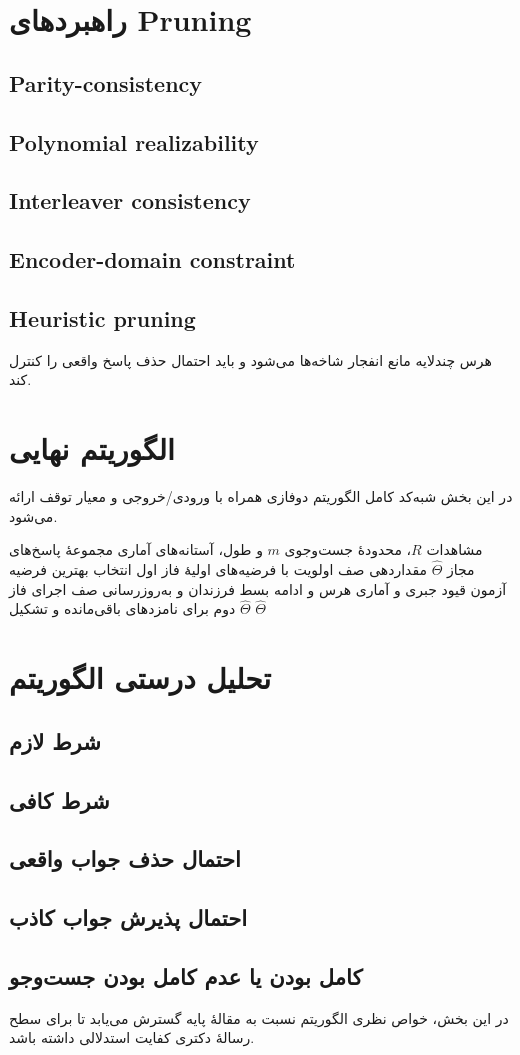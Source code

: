 \section{راهبردهای Pruning}
\subsection{Parity-consistency}
\subsection{Polynomial realizability}
\subsection{Interleaver consistency}
\subsection{Encoder-domain constraint}
\subsection{Heuristic pruning}
هرس چندلایه مانع انفجار شاخه‌ها می‌شود و باید احتمال حذف پاسخ واقعی را کنترل کند.

\section{الگوریتم نهایی}
در این بخش شبه‌کد کامل الگوریتم دوفازی همراه با ورودی/خروجی و معیار توقف ارائه می‌شود.

\begin{algorithm}[ht]
\caption{اسکلت الگوریتم بازسازی کور مشترک کد توربو}
\label{alg:joint-blind}
\begin{algorithmic}[1]
\REQUIRE مشاهدات \(R\)، محدودهٔ جست‌وجوی \(m\) و طول، آستانه‌های آماری
\ENSURE مجموعهٔ پاسخ‌های مجاز \(\widehat{\Theta}\)
\STATE مقداردهی صف اولویت با فرضیه‌های اولیهٔ فاز اول
	\STATE انتخاب بهترین فرضیه
	\STATE آزمون قیود جبری و آماری
		\STATE هرس و ادامه
	\ENDIF
	\STATE بسط فرزندان و به‌روزرسانی صف
\ENDWHILE
\STATE اجرای فاز دوم برای نامزدهای باقی‌مانده و تشکیل \(\widehat{\Theta}\)
\RETURN \(\widehat{\Theta}\)
\end{algorithmic}
\end{algorithm}

\section{تحلیل درستی الگوریتم}
\subsection{شرط لازم}
\subsection{شرط کافی}
\subsection{احتمال حذف جواب واقعی}
\subsection{احتمال پذیرش جواب کاذب}
\subsection{کامل بودن یا عدم کامل بودن جست‌وجو}
در این بخش، خواص نظری الگوریتم نسبت به مقالهٔ پایه گسترش می‌یابد تا برای سطح رسالهٔ دکتری کفایت استدلالی داشته باشد.
